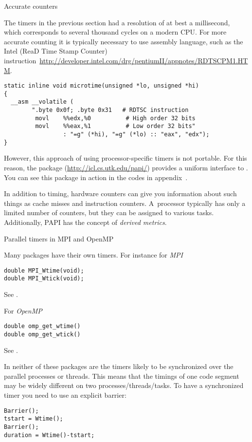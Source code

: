 
 {Accurate counters}

The timers in the previous section had a resolution of at best a
millisecond, which corresponds to several thousand cycles on a modern
CPU. For more accurate counting it is typically necessary to use
assembly language, such as the Intel  (ReaD Time Stamp
Counter)
instruction~\url{http://developer.intel.com/drg/pentiumII/appnotes/RDTSCPM1.HTM}.
\begin{verbatim}
static inline void microtime(unsigned *lo, unsigned *hi)
{
  __asm __volatile (
        ".byte 0x0f; .byte 0x31   # RDTSC instruction
         movl    %%edx,%0          # High order 32 bits
         movl    %%eax,%1          # Low order 32 bits"
                 : "=g" (*hi), "=g" (*lo) :: "eax", "edx");
}                                                
\end{verbatim}
However,
this approach of using processor-specific timers is not portable. For
this reason, the  package (\url{http://icl.cs.utk.edu/papi/})
provides a uniform interface to .
You can see this package in action in the codes in
appendix~.

In addition to timing, hardware counters can give you information about 
such things as cache misses and instruction counters. A~processor typically
has only a limited number of counters, but they can be assigned to various tasks.
Additionally, PAPI has the concept of \emph{derived metrics}.

 {Parallel timers in MPI and OpenMP}

Many packages have their own timers. For instance for
\emph{MPI}
\begin{lstlisting}
double MPI_Wtime(void);
double MPI_Wtick(void);
\end{lstlisting}
See .

For
\emph{OpenMP}
\begin{lstlisting}
double omp_get_wtime()
double omp_get_wtick()
\end{lstlisting}
See .

In neither of these packages are the timers
likely to be synchronized over the
parallel processes or threads.
This means that the timings of one code segment may be widely different
on two processes/threads/tasks.
To have a synchronized timer you need
to use an explicit barrier:
\begin{lstlisting}
Barrier();
tstart = Wtime();
Barrier();
duration = Wtime()-tstart;
\end{lstlisting}

